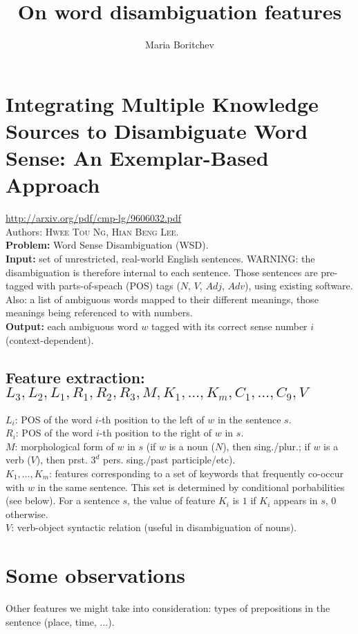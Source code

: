 \documentclass[a4paper,11pt]{article}
\title{On word disambiguation features}
\author{Maria Boritchev}
\begin{document}
\maketitle


\section{Integrating Multiple Knowledge Sources to
Disambiguate Word Sense: An Exemplar-Based Approach}
\url{http://arxiv.org/pdf/cmp-lg/9606032.pdf} \\
Authors: \textsc{Hwee Tou Ng}, \textsc{Hian Beng Lee}. \\

\noindent \textbf{Problem:} Word Sense Disambiguation (WSD).\\
\textbf{Input:} set of unrestricted, real-world English sentences. WARNING: the disambiguation is therefore internal to each sentence. Those sentences are pre-tagged with parts-of-speach (POS) tags ($N$, $V$, $Adj$, $Adv$), using existing software. Also: a list of ambiguous words mapped to their different meanings, those meanings being referenced to with numbers.\\
\textbf{Output:} each ambiguous word $w$ tagged with its correct sense number $i$ (context-dependent).\\

\subsection{Feature extraction: $L_3,L_2,L_1,R_1,R_2,R_3,M,K_1,\dots,K_m,C_1,\dots,C_9,V$}
$L_i$: POS of the word $i$-th position to the left of $w$ in the sentence $s$. \\
$R_i$: POS of the word $i$-th position to the right of $w$ in $s$.\\
$M$: morphological form of $w$ in $s$ (if $w$ is a noun ($N$), then sing./plur.; if $w$ is a verb ($V$), then prst. $3^d$ pers. sing./past participle/etc).\\

\noindent $K_1,\dots,K_m$: features corresponding to a set of keywords that frequently co-occur with $w$ in the same sentence. This set is determined by conditional porbabilities (see below). For a sentence $s$, the value of feature $K_i$ is $1$ if $K_i$ appears in $s$, $0$ otherwise.\\
$V$: verb-object syntactic relation (useful in disambiguation of nouns).

\section{Some observations}
Other features we might take into consideration: types of prepositions in the sentence (place, time, ...).



 
\end{document}
